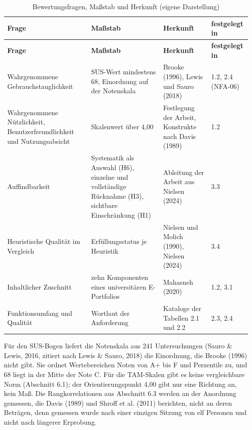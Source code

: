 \begingroup
\small
\setlength{\tabcolsep}{4pt}
\begin{longtable}{@{}L{3.2cm}L{4.6cm}L{4.2cm}L{1.7cm}@{}}
	\caption[Bewertungsfragen, Maßstab und Herkunft]{Bewertungsfragen, Maßstab und Herkunft (eigene Darstellung)}
	\label{tab:bewertungsrahmen}\\
	\toprule
	\textbf{Frage} & \textbf{Maßstab} & \textbf{Herkunft} & \textbf{festgelegt in} \\
	\midrule
	\endfirsthead
	\toprule
	\textbf{Frage} & \textbf{Maßstab} & \textbf{Herkunft} & \textbf{festgelegt in} \\
	\midrule
	\endhead
	\bottomrule
	\endfoot
	Wahrgenommene Gebrauchstauglichkeit & SUS-Wert mindestens 68, Einordnung auf der Notenskala & Brooke (1996), Lewis und Sauro (2018) & 1.2, 2.4 (NFA-06) \\
	Wahrgenommene Nützlichkeit, Benutzerfreundlichkeit und Nutzungsabsicht & Skalenwert über 4,00 & Festlegung der Arbeit, Konstrukte nach Davis (1989) & 1.2 \\
	Auffindbarkeit & Systematik als Auswahl (H6), einzelne und vollständige Rücknahme (H3), sichtbare Einschränkung (H1) & Ableitung der Arbeit aus Nielsen (2024) & 3.3 \\
	Heuristische Qualität im Vergleich & Erfüllungsstatus je Heuristik & Nielsen und Molich (1990), Nielsen (2024) & 3.4 \\
	Inhaltlicher Zuschnitt & zehn Komponenten eines universitären E-Portfolios & Mahasneh (2020) & 1.2, 3.1 \\
	Funktionsumfang und Qualität & Wortlaut der Anforderung & Kataloge der Tabellen 2.1 und 2.2 & 2.3, 2.4 \\
\end{longtable}
\endgroup

Für den SUS-Bogen liefert die Notenskala aus 241 Untersuchungen (Sauro \& Lewis, 2016, zitiert nach Lewis \& Sauro, 2018) die Einordnung, die Brooke (1996) nicht gibt. Sie ordnet Wertebereichen Noten von A+ bis F und Perzentile zu, und 68 liegt in der Mitte der Note C. Für die TAM-Skalen gibt es keine vergleichbare Norm (Abschnitt 6.1); der Orientierungspunkt 4,00 gibt nur eine Richtung an, kein Maß. Die Rangkorrelationen aus Abschnitt 6.3 werden an der Anordnung gemessen, die Davis (1989) und Shroff et al. (2011) berichten, nicht an deren Beträgen, denn gemessen wurde nach einer einzigen Sitzung von elf Personen und nicht nach längerer Erprobung.

